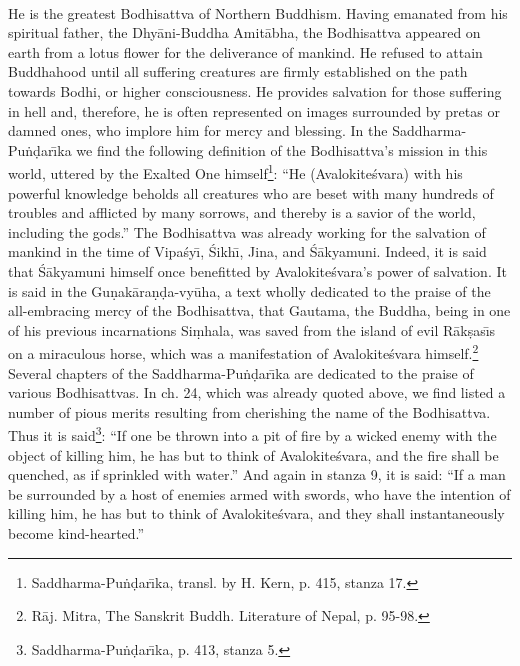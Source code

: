 \documentclass[a4paper, 12pt, oneside]{article}
\begin{document}
\paragraph{}
He is the greatest Bodhisattva of Northern Buddhism. Having emanated from his spiritual father, the Dhy\={a}ni-Buddha Amit\={a}bha, the Bodhisattva appeared on earth from a lotus flower for the deliverance of mankind. He refused to attain Buddhahood until all suffering creatures are firmly established on the path towards Bodhi, or higher consciousness. He provides salvation for those suffering in hell and, therefore, he is often represented on images surrounded by pretas or damned ones, who implore him for mercy and blessing. In the Saddharma-Pu\.{n}\d{d}ar\={\i}ka we find the following definition of the Bodhisattva's mission in this world, uttered by the Exalted One himself\footnote{Saddharma-Pu\.{n}\d{d}ar\={\i}ka, transl. by H. Kern, p. 415, stanza 17.}: ``He (Avalokite\'{s}vara) with his powerful knowledge beholds all creatures who are beset with many hundreds of troubles and afflicted by many sorrows, and thereby is a savior of the world, including the gods.'' The Bodhisattva was already working for the salvation of mankind in the time of Vipa\'{s}y\={\i}, \'{S}ikh\={\i}, Jina, and \'{S}\={a}kyamuni. Indeed, it is said that \'{S}\={a}kyamuni himself once benefitted by Avalokite\'{s}vara's power of salvation. It is said in the Gu\d{n}ak\={a}ra\d{n}\d{d}a-vy\={u}ha, a text wholly dedicated to the praise of the all-embracing mercy of the Bodhisattva, that Gautama, the Buddha, being in one of his previous incarnations Si\d{m}hala, was saved from the island of evil R\={a}k\d{s}as\={\i}s on a miraculous horse, which was a manifestation of Avalokite\'{s}vara himself.\footnote{R\={a}j. Mitra, The Sanskrit Buddh. Literature of Nepal, p. 95-98.} Several chapters of the Saddharma-Pu\.{n}\d{d}ar\={\i}ka are dedicated to the praise of various Bodhisattvas. In ch. 24, which was already quoted above, we find listed a number of pious merits resulting from cherishing the name of the Bodhisattva. Thus it is said\footnote{Saddharma-Pu\.{n}\d{d}ar\={\i}ka, p. 413, stanza 5.}: ``If one be thrown into a pit of fire by a wicked enemy with the object of killing him, he has but to think of Avalokite\'{s}vara, and the fire shall be quenched, as if sprinkled with water.'' And again in stanza 9, it is said: ``If a man be surrounded by a host of enemies armed with swords, who have the intention of killing him, he has but to think of Avalokite\'{s}vara, and they shall instantaneously become kind-hearted.''
\end{document}
